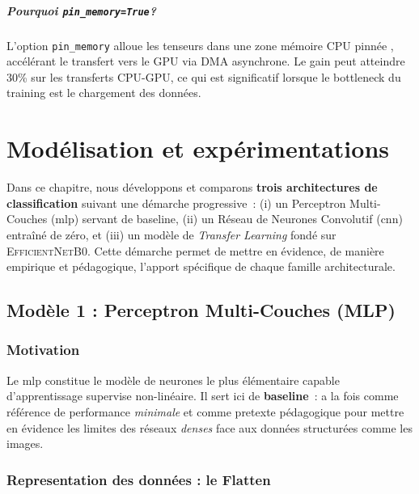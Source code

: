 \documentclass[12pt,a4paper,openany]{report}
\begin{document}
\paragraph{Pourquoi \texttt{pin\_memory=True}?}
L'option \texttt{pin\_memory} alloue les tenseurs dans une zone mémoire CPU \og pinnée \fg, accélérant le transfert vers le GPU via DMA asynchrone. Le gain peut atteindre 30\% sur les transferts CPU-GPU, ce qui est significatif lorsque le bottleneck du training est le chargement des données.


\chapter{Modélisation et expérimentations}
\label{chap:modelisation}

Dans ce chapitre, nous développons et comparons \textbf{trois architectures de classification} suivant une démarche progressive~: (i) un Perceptron Multi-Couches (\gls{mlp}) servant de baseline, (ii) un Réseau de Neurones Convolutif (\gls{cnn}) entraîné de zéro, et (iii) un modèle de \emph{Transfer Learning} fondé sur \textsc{EfficientNetB0}. Cette démarche permet de mettre en évidence, de manière empirique et pédagogique, l'apport spécifique de chaque famille architecturale.

\section{Modèle 1 : Perceptron Multi-Couches (MLP)}

\subsection{Motivation}

Le \gls{mlp} constitue le modèle de neurones le plus élémentaire capable d'apprentissage supervise non-linéaire. Il sert ici de \textbf{baseline}~: a la fois comme référence de performance \emph{minimale} et comme pretexte pédagogique pour mettre en évidence les limites des réseaux \emph{denses} face aux données structurées comme les images.

\subsection{Representation des données : le Flatten}
\end{document}
